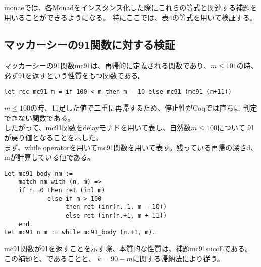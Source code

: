 \documentclass[japanese]{jssst_ppl}
\theoremstyle{definition}
\def\coqin#1{\text{\texttt{#1}}}
\begin{document}
\iffalse
  \begin{verbatim}
  M : monad
  Lemma bindretf (A B: UU0) (a : A) (f : A -> M B): Ret a >>= f = f a.
  Lemma bindmret (A B: UU0) (m : M A) : m >>= Ret = Ret.
  Lemma bindA (A B C: UU0) (m: M A) (f: A -> M B)(g: B -> F C):
    (m >>= f) >>= g = m >>= (fun x => f x >>= g).
\end{verbatim}

\fi





monaeでは、各Monadをインスタンス化した際にこれらの等式と関連する補題を
用いることができるようになる。
特にここでは、表4の等式を用いて検証する。





\subsection{マッカーシーの91関数に対する検証}
マッカーシーの91関数mc91は、再帰的に定義される関数であり、$m \leq 101$の時、
必ず91を返すという性質をもつ関数である。

\begin{verbatim}
let rec mc91 m = if 100 < m then m - 10 else mc91 (mc91 (m+11))
   \end{verbatim}

$m \leq 100$の時、11足した値で二重に再帰するため、停止性がCoqでは直ちに
判定できない関数である。\\
したがって、mc91関数をdelayモナドを用いて表し、自然数$m \leq 100$について
91が戻り値となることを示した。\\
まず、while operatorを用いてmc91関数を用いて表す。残っている再帰の深さd、mが計算している値である。



\begin{verbatim}
Let mc91_body nm :=
    match nm with (n, m) =>
    if n==0 then ret (inl m)
            else if m > 100
                 then ret (inr(n.-1, m - 10))
                 else ret (inr(n.+1, m + 11))
    end.
Let mc91 n m := while mc91_body (n.+1, m).
    \end{verbatim}

mc91関数が91を返すことを示す際、本質的な性質は、補題mc91succEである。
この補題と、\coqin{mc91 n 101 |$\approx$| Ret 91}であることと、
$ k =  90 - m $に関する帰納法により従う。
\end{document}
